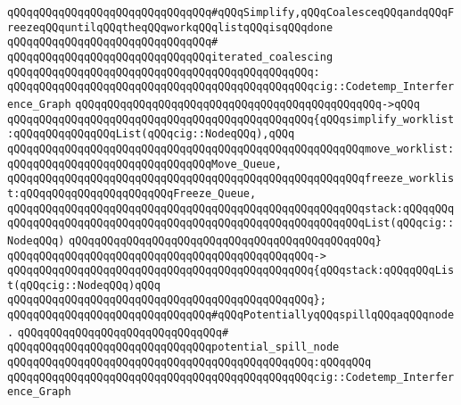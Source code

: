 \newline
\newline
\verb|qQQqqQQqqQQqqQQqqQQqqQQqqQQqqQQq#qQQqSimplify,qQQqCoalesceqQQqandqQQqFreezeqQQquntilqQQqtheqQQqworkqQQqlistqQQqisqQQqdone|\newline
\verb|qQQqqQQqqQQqqQQqqQQqqQQqqQQqqQQq#|\newline
\verb|qQQqqQQqqQQqqQQqqQQqqQQqqQQqqQQqiterated_coalescing|\newline
\verb|qQQqqQQqqQQqqQQqqQQqqQQqqQQqqQQqqQQqqQQqqQQqqQQq:|\newline
\verb|qQQqqQQqqQQqqQQqqQQqqQQqqQQqqQQqqQQqqQQqqQQqqQQqcig::Codetemp_Interference_Graph|\newline
\verb|qQQqqQQqqQQqqQQqqQQqqQQqqQQqqQQqqQQqqQQqqQQqqQQq->qQQq|\newline
\verb|qQQqqQQqqQQqqQQqqQQqqQQqqQQqqQQqqQQqqQQqqQQqqQQq{qQQqsimplify_worklist:qQQqqQQqqQQqqQQqList(qQQqcig::NodeqQQq),qQQq|\newline
\verb|qQQqqQQqqQQqqQQqqQQqqQQqqQQqqQQqqQQqqQQqqQQqqQQqqQQqqQQqmove_worklist:qQQqqQQqqQQqqQQqqQQqqQQqqQQqqQQqMove_Queue,|\newline
\verb|qQQqqQQqqQQqqQQqqQQqqQQqqQQqqQQqqQQqqQQqqQQqqQQqqQQqqQQqfreeze_worklist:qQQqqQQqqQQqqQQqqQQqqQQqFreeze_Queue,|\newline
\verb|qQQqqQQqqQQqqQQqqQQqqQQqqQQqqQQqqQQqqQQqqQQqqQQqqQQqqQQqstack:qQQqqQQqqQQqqQQqqQQqqQQqqQQqqQQqqQQqqQQqqQQqqQQqqQQqqQQqqQQqqQQqList(qQQqcig::NodeqQQq)|\newline
\verb|qQQqqQQqqQQqqQQqqQQqqQQqqQQqqQQqqQQqqQQqqQQqqQQq}|\newline
\verb|qQQqqQQqqQQqqQQqqQQqqQQqqQQqqQQqqQQqqQQqqQQqqQQq->|\newline
\verb|qQQqqQQqqQQqqQQqqQQqqQQqqQQqqQQqqQQqqQQqqQQqqQQq{qQQqstack:qQQqqQQqList(qQQqcig::NodeqQQq)qQQq|\newline
\verb|qQQqqQQqqQQqqQQqqQQqqQQqqQQqqQQqqQQqqQQqqQQqqQQq};|\newline
\newline
\newline
\verb|qQQqqQQqqQQqqQQqqQQqqQQqqQQqqQQq#qQQqPotentiallyqQQqspillqQQqaqQQqnode.|\newline
\verb|qQQqqQQqqQQqqQQqqQQqqQQqqQQqqQQq#|\newline
\verb|qQQqqQQqqQQqqQQqqQQqqQQqqQQqqQQqpotential_spill_node|\newline
\verb|qQQqqQQqqQQqqQQqqQQqqQQqqQQqqQQqqQQqqQQqqQQqqQQq:qQQqqQQq|\newline
\verb|qQQqqQQqqQQqqQQqqQQqqQQqqQQqqQQqqQQqqQQqqQQqqQQqcig::Codetemp_Interference_Graph|\newline

